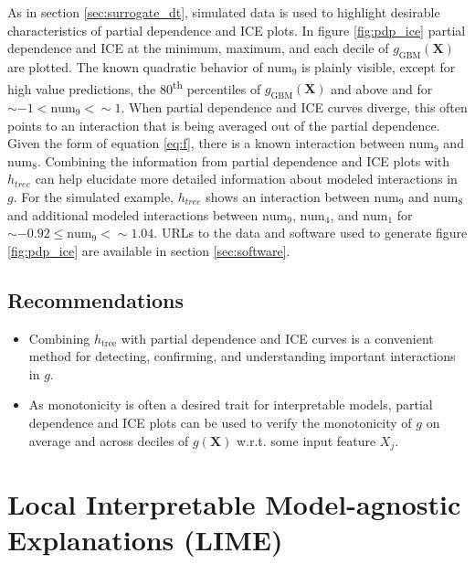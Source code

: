 \documentclass{article}
\begin{document}
As in section \ref{sec:surrogate_dt}, simulated data is used to highlight desirable characteristics of partial dependence and ICE plots. In figure \ref{fig:pdp_ice} partial dependence and ICE at the minimum, maximum, and each decile of $g_{\text{GBM}}(\mathbf{X})$ are plotted. The known quadratic behavior of $\text{num}_9$ is plainly visible, except for high value predictions, the 80\textsuperscript{th} percentiles of $g_{\text{GBM}}(\mathbf{X})$ and above and for $\sim-1 < \text{num}_9 < \sim1$. When partial dependence and ICE curves diverge, this often points to an interaction that is being averaged out of the partial dependence. Given the form of equation \ref{eq:f}, there is a known interaction between $\text{num}_9$ and $\text{num}_8$. Combining the information from partial dependence and ICE plots with $h_{tree}$ can help elucidate more detailed information about modeled interactions in $g$. For the simulated example, $h_{tree}$ shows an interaction between $\text{num}_9$ and $\text{num}_8$ and additional modeled interactions between $\text{num}_9$, $\text{num}_4$, and $\text{num}_1$ for $\sim -0.92 \le \text{num}_9 <  \sim 1.04.$ URLs to the data and software used to generate figure \ref{fig:pdp_ice} are available in section \ref{sec:software}.

\subsection{Recommendations}

\begin{itemize}

\item Combining $h_{\text{tree}}$ with partial dependence and ICE curves is a convenient method for detecting, confirming, and understanding important interactions in $g$.

\item As monotonicity is often a desired trait for interpretable models, partial dependence and ICE plots can be used to verify the monotonicity of $g$ on average and across deciles of $g(\mathbf{X})$ w.r.t. some input feature $X_j$.

\end{itemize}

\section{Local Interpretable Model-agnostic Explanations (LIME)}
\label{sec:lime}
\end{document}
